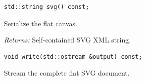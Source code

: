 \par\noindent\begin{minipage}{\linewidth}
\begin{lstlisting}[style=apireference]
std::string svg() const;
\end{lstlisting}
{\footnotesize Serialize the flat canvas.\par}
{\footnotesize\textit{Returns:} Self-contained SVG XML string.\par}
\end{minipage}\par\vspace{1pt}
\par\noindent\begin{minipage}{\linewidth}
\begin{lstlisting}[style=apireference]
void write(std::ostream &output) const;
\end{lstlisting}
{\footnotesize Stream the complete flat SVG document.\par}
\end{minipage}\par\vspace{1pt}
